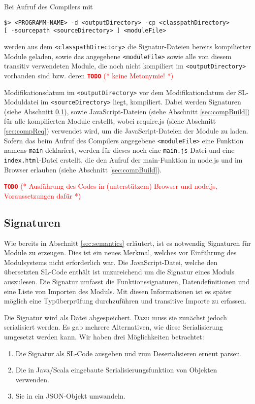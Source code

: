 \documentclass[runningheads]{llncs}
\newcommand{\TODO}[1]{ \textcolor{red}{\textbf{\texttt{\large{TODO}}} (* #1 *)}\par}
\begin{document}
Bei Aufruf des Compilers mit
\begin{lstlisting}
$> <PROGRAMM-NAME> -d <outputDirectory> -cp <classpathDirectory>
[ -sourcepath <sourceDirectory> ] <moduleFile>
\end{lstlisting}

werden aus dem \texttt{<classpathDirectory>} die Signatur-Dateien
bereits kompilierter Module geladen, sowie das angegebene
\texttt{<moduleFile>} sowie alle von diesem transitiv verwendeten Module,
die noch nicht kompiliert im \texttt{<outputDirectory>} vorhanden sind
bzw. deren \TODO{keine Metonymie!} Modifikationsdatum im
\texttt{<outputDirectory>} vor dem Modifikationdatum der
SL-Moduldatei im \texttt{<sourceDirectory>} liegt, kompiliert. Dabei
werden Signaturen (siehe Abschnitt \ref{sec:compSig}), sowie
JavaScript-Dateien (siehe Abschnitt \ref{sec:compBuild}) für alle
kompilierten Module erstellt, wobei require.js (siehe Abschnitt
\ref{sec:compReq}) verwendet wird, um die JavaScript-Dateien der
Module zu laden. Sofern das beim Aufruf des Compilers angegebene
\texttt{<moduleFile>} eine Funktion namens
\texttt{main} deklariert, werden für dieses noch eine
\texttt{main.js}-Datei und eine \texttt{index.html}-Datei erstellt,
die den Aufruf der main-Funktion in node.js und im Browser erlauben
(siehe Abschnitt \ref{sec:compBuild}).

\TODO{Ausführung des Codes in (unterstützem) Browser und node.js,
Voraussetzungen dafür}

\subsection{Signaturen}
\label{sec:compSig}

Wie bereits in Abschnitt \ref{sec:semantics} erläutert, ist es notwendig Signaturen für Module zu erzeugen. Dies ist ein neues Merkmal, welches vor Einführung des Modulsystems nicht erforderlich war. Die JavaScript-Datei, welche den übersetzten SL-Code enthält ist unzureichend um die Signatur eines Moduls auszulesen. Die Signatur umfasst die Funktionssignaturen, Datendefinitionen und eine Liste von Importen des Moduls. Mit diesen Informationen ist es später möglich eine Typüberprüfung durchzuführen und transitive Importe zu erfassen.

Die Signatur wird als Datei abgespeichert. Dazu muss sie zunächst jedoch serialisiert werden. Es gab mehrere Alternativen, wie diese Serialisierung umgesetzt werden kann. Wir haben drei Möglichkeiten betrachtet:

\begin{enumerate}
 \item Die Signatur als SL-Code ausgeben und zum Deserialisieren erneut parsen.
 \item Die in Java/Scala eingebaute Serialisierungsfunktion von Objekten verwenden.
 \item Sie in ein JSON-Objekt umwandeln.
\end{enumerate}
\end{document}
